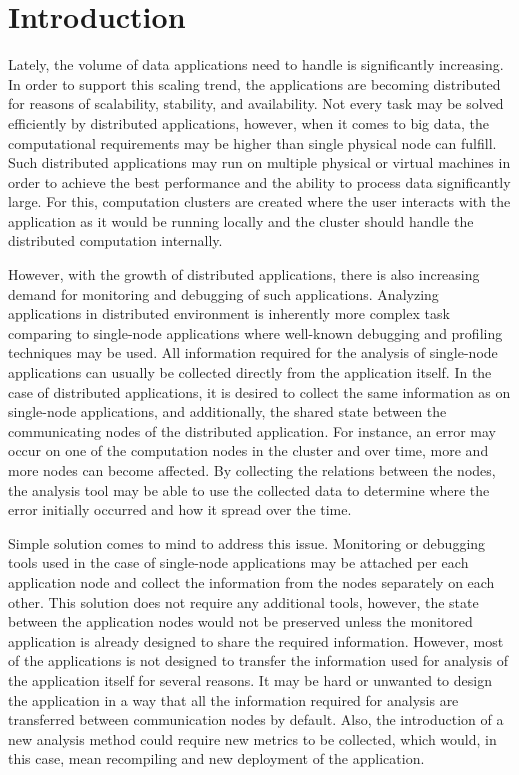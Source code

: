 \chapter{Introduction}
Lately, the volume of data applications need to handle is significantly increasing. In order to support this scaling trend, the applications are becoming distributed for reasons of scalability, stability, and availability. Not every task may be solved efficiently by distributed applications, however, when it comes to big data, the computational requirements may be higher than single physical node can fulfill. Such distributed applications may run on multiple physical or virtual machines in order to achieve the best performance and the ability to process data significantly large. For this, computation clusters are created where the user interacts with the application as it would be running locally and the cluster should handle the distributed computation internally.

However, with the growth of distributed applications, there is also increasing demand for monitoring and debugging of such applications. Analyzing applications in distributed environment is inherently more complex task comparing to single-node applications where well-known debugging and profiling techniques may be used. All information required for the analysis of single-node applications can usually be collected directly from the application itself. In the case of distributed applications, it is desired to collect the same information as on single-node applications, and additionally, the shared state between the communicating nodes of the distributed application. For instance, an error may occur on one of the computation nodes in the cluster and over time, more and more nodes can become affected. By collecting the relations between the nodes, the analysis tool may be able to use the collected data to determine where the error initially occurred and how it spread over the time. 

Simple solution comes to mind to address this issue. Monitoring or debugging tools used in the case of single-node applications may be attached per each application node and collect the information from the nodes separately on each other. This solution does not require any additional tools, however, the state between the application nodes would not be preserved unless the monitored application is already designed to share the required information. However, most of the applications is not designed to transfer the information used for analysis of the application itself for several reasons. It may be hard or unwanted to design the application in a way that all the information required for analysis are transferred between communication nodes by default. Also, the introduction of a new analysis method could require new metrics to be collected, which would, in this case, mean recompiling and new deployment of the application.

